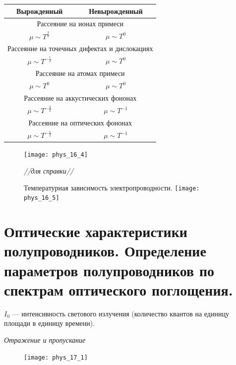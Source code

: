 \begin{table}[h!]
    \centering
    \begin{tabular}{cc}
     Вырожденный  & Невырожденный \\ \hline \hline 
    \multicolumn{2}{c}{Рассеяние на ионах примеси} \\ 
    $\mu \sim T^{\frac{3}{2}}$ & $\mu \sim T^{0}$ \\ 
    \multicolumn{2}{c}{Рассеяние на точечных дифектах и дислокациях} \\ 
    $\mu \sim T^{-\frac{1}{2}}$ & $\mu \sim T^{0}$ \\ 
    \multicolumn{2}{c}{Рассеяние на атомах примеси} \\  
    $\mu \sim T^{0}$ & $\mu \sim T^{0}$ \\ 
    \multicolumn{2}{c}{Рассеяние на аккустических фононах} \\ 
    $\mu \sim T^{-\frac{3}{2}}$ & $\mu \sim T^{-1}$ \\  
    \multicolumn{2}{c}{Рассеяние на оптических фононах} \\ 
    $\mu \sim T^{-\frac{1}{2}}$ & $\mu \sim T^{-1}$ \\ \hline 
    \end{tabular}
\end{table}

\begin{figure}[h!]
    \centering
    \texttt{[image: phys\_16\_4]}
\end{figure}

\clearpage
\begin{figure}[h!]
    \textit{//для справки//}

    Температурная зависимость электропроводности.
    \centering
    \texttt{[image: phys\_16\_5]}
\end{figure}

\pagebreak

\section{Оптические характеристики полупроводников. Определение параметров полупроводников по спектрам оптического поглощения.}

$I_0$ --- интенсивность светового излучения (количество квантов на единицу площади в единицу времени).

\textit{Отражение и пропускание}

\begin{figure}[h!]
    \centering
    \texttt{[image: phys\_17\_1]}
\end{figure}

